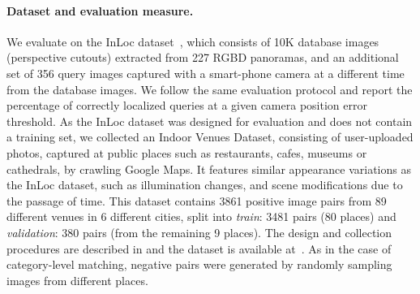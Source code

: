 \documentclass{article}
\begin{document}
\paragraph{Dataset and evaluation measure.}
We evaluate on the InLoc dataset~\cite{Taira18}, 
which consists of 10K database images (perspective cutouts) extracted from 227 RGBD panoramas, and an additional set of 356 query images captured with a smart-phone camera at a different time from the database images. We follow the same evaluation protocol and report the percentage of correctly localized queries at a given camera position error threshold. As the InLoc dataset was designed for evaluation and does not contain a training set, we collected an Indoor Venues Dataset, consisting of user-uploaded photos, captured at public places such as restaurants, cafes, museums or cathedrals, by crawling Google Maps. It features similar appearance variations as the InLoc dataset, such as illumination changes, and scene modifications due to the passage of time. This dataset contains 3861 positive image pairs from 89 different venues in 6 different cities, split into \emph{train}: 3481 pairs (80 places) and \emph{validation}: 380 pairs (from the remaining 9 places). The design and collection procedures are described in  and the dataset is available at~\cite{website}. As in the case of category-level matching, negative pairs were generated by randomly sampling images from different places.
\end{document}
